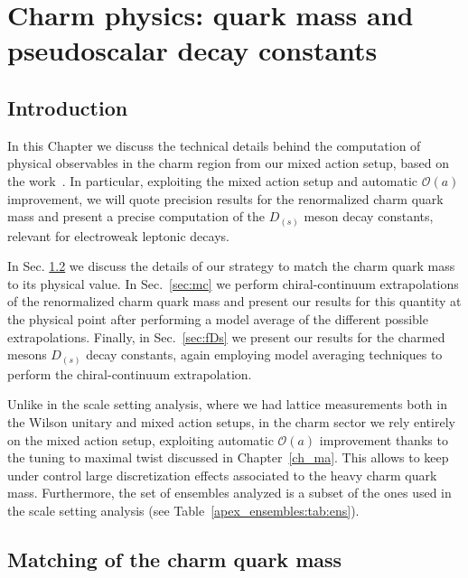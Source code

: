 \chapter{Charm physics: quark mass and pseudoscalar decay constants}%
\label{ch_charm}


\section{Introduction}
\label{ch_qm:sec:introduction}

In this Chapter we discuss the technical details behind the computation of physical observables in the charm region from our mixed action setup, based on the work~\citep{charm}. In particular, exploiting the mixed action setup and automatic $\mathcal{O}(a)$ improvement, we will quote precision results for the renormalized charm quark mass and present a precise computation of the $D_{(s)}$ meson decay constants, relevant for electroweak leptonic decays. 

In Sec. \ref{sec:matching_charm} we discuss the details of our strategy to match the charm quark mass to its physical value. In Sec.~\ref{sec:mc} we perform chiral-continuum extrapolations of the renormalized charm quark mass and present our results for this quantity at the physical point after performing a model average of the different possible extrapolations. Finally, in Sec.~\ref{sec:fDs} we present our results for the charmed mesons $D_{(s)}$ decay constants, again employing model averaging techniques to perform the chiral-continuum extrapolation.

Unlike in the scale setting analysis, where we had lattice measurements both in the Wilson unitary and mixed action setups, in the charm sector we rely entirely on the mixed action setup, exploiting automatic $\mathcal{O}(a)$ improvement thanks to the tuning to maximal twist discussed in Chapter~\ref{ch_ma}. This allows to keep under control large discretization effects associated to the heavy charm quark mass. Furthermore, the set of ensembles analyzed is a subset of the ones used in the scale setting analysis (see Table~\ref{apex_ensembles:tab:ens}).

\section{Matching of the charm quark mass}
\label{sec:matching_charm}

